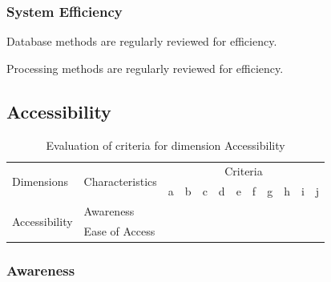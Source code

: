 \subsubsection{System Efficiency}

\begin{QandA}
    \item Database methods are regularly reviewed for efficiency.
    \begin{answered}
        
    \end{answered}

    \item Processing methods are regularly reviewed for efficiency.
    \begin{answered}
        
    \end{answered}

\end{QandA}

\subsection{Accessibility}

\begin{table}[htbp]
    \centering

    \begin{tabular}{llrrrrrrrrrr}
        \toprule
        \multirow{2}{*}{Dimensions}     & \multirow{2}{*}{Characteristics}  & \multicolumn{10}{c}{Criteria}         \\ \cmidrule(lr){3-12}
                                        &                                   & a & b & c & d & e & f & g & h & i & j \\ \midrule
        \multirow{2}{*}{Accessibility}  & Awareness                         &   &   &   &   &   &   &   &   &   &   \\
                                        & Ease of Access                    &   &   &   &   &   &   &   &   &   &   \\
        \bottomrule
    \end{tabular}

    \caption{Evaluation of criteria for dimension Accessibility}
    \label{table:accessibility-benchmark}
\end{table}
\FloatBarrier

\subsubsection{Awareness}

